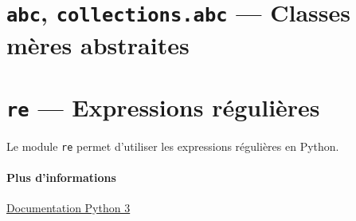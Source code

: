 \documentclass[a4paper, 10pt]{article}
\begin{document}
\section{\texttt{abc}, \texttt{collections.abc} --- Classes mères abstraites}\label{abc}

\section{\texttt{re} --- Expressions régulières}
Le module \texttt{re}  permet d'utiliser les expressions régulières en Python.
\paragraph{Plus d'informations} \href{https://docs.python.org/fr/3/library/re.html}{Documentation Python 3}
\end{document}
